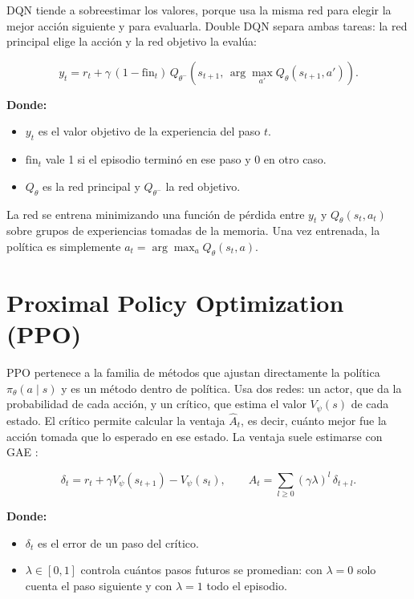 DQN tiende a sobreestimar los valores, porque usa la misma red para elegir la mejor acción
siguiente y para evaluarla. Double DQN \cite{vanhasselt2016ddqn} separa ambas tareas: la red
principal elige la acción y la red objetivo la evalúa:

\begin{equation}
    y_t = r_t + \gamma\,(1 - \text{fin}_t)\,
    Q_{\theta^-}\!\left(s_{t+1},\, \arg\max_{a'} Q_{\theta}(s_{t+1}, a')\right).
    \label{eq:ddqn_target}
\end{equation}

\noindent\textbf{Donde:}
\begin{itemize}
    \item $y_t$ es el valor objetivo de la experiencia del paso $t$.
    \item $\text{fin}_t$ vale 1 si el episodio terminó en ese paso y 0 en otro caso.
    \item $Q_\theta$ es la red principal y $Q_{\theta^-}$ la red objetivo.
\end{itemize}

La red se entrena minimizando una función de pérdida entre $y_t$ y $Q_\theta(s_t, a_t)$
sobre grupos de experiencias tomadas de la memoria. Una vez entrenada, la política es
simplemente $a_t = \arg\max_a Q_\theta(s_t, a)$.

\section{Proximal Policy Optimization (PPO)}
\label{sec:ppo}

PPO \cite{schulman2017ppo} pertenece a la familia de métodos que ajustan directamente la
política $\pi_\theta(a \mid s)$ y es un método dentro de política. Usa dos redes: un actor,
que da la probabilidad de cada acción, y un crítico, que estima el valor $V_\psi(s)$ de cada
estado. El crítico permite calcular la ventaja $\hat{A}_t$, es decir, cuánto mejor fue la
acción tomada que lo esperado en ese estado. La ventaja suele estimarse con GAE
\cite{schulman2016gae}:

\begin{equation}
    \delta_t = r_t + \gamma V_\psi(s_{t+1}) - V_\psi(s_t),
    \qquad
    \hat{A}_t = \sum_{l \geq 0} (\gamma\lambda)^l\, \delta_{t+l}.
    \label{eq:gae}
\end{equation}

\noindent\textbf{Donde:}
\begin{itemize}
    \item $\delta_t$ es el error de un paso del crítico.
    \item $\lambda \in [0,1]$ controla cuántos pasos futuros se promedian: con $\lambda = 0$ solo cuenta el paso siguiente y con $\lambda = 1$ todo el episodio.
\end{itemize}


